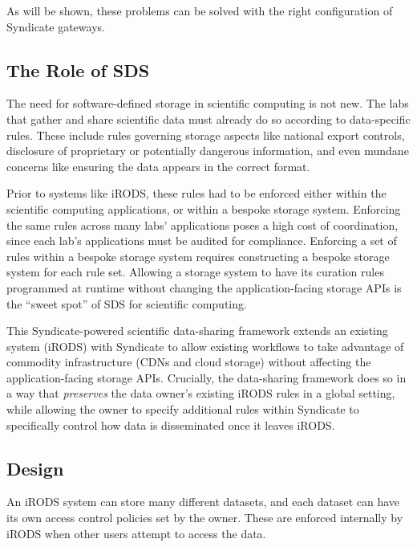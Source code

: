 As will be shown, these problems can be solved with the right configuration of Syndicate gateways.

\subsection{The Role of SDS}

The need for software-defined storage in scientific computing is not new.  The
labs that gather and share scientific data must already do so according to
data-specific rules.  These include rules governing storage aspects like
national export controls, disclosure of proprietary or potentially dangerous information, and
even mundane concerns like ensuring the data appears in the correct format.

Prior to systems like iRODS, these rules had to be enforced either within the
scientific computing applications, or within a bespoke storage system.
Enforcing the same rules across many labs' applications poses a high cost of
coordination, since each lab's applications must be audited for compliance.
Enforcing a set of rules within a bespoke storage system requires constructing a
bespoke storage system for each rule set.  Allowing a storage system to have its
curation rules programmed at runtime without changing the application-facing
storage APIs is the ``sweet spot'' of SDS for scientific computing.

This Syndicate-powered scientific data-sharing framework extends an existing system (iRODS) with
Syndicate to allow existing workflows to take advantage of commodity infrastructure
(CDNs and cloud storage) without affecting the application-facing storage APIs.
Crucially, the data-sharing framework does so in a way that \emph{preserves} the data owner's existing iRODS
rules in a global setting, while allowing the owner to specify additional
rules within Syndicate to specifically control how data is disseminated once it
leaves iRODS.

\subsection{Design}

An iRODS system can store many different datasets, and each dataset can have its
own access control policies set by the owner.  These are enforced internally by
iRODS when other users attempt to access the data.

